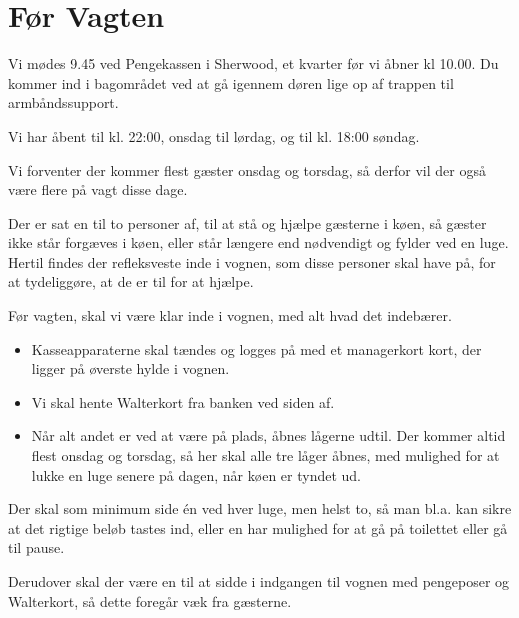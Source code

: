 \section{Før Vagten}
\label{sec:pre-vagten}

Vi mødes 9.45 ved Pengekassen i Sherwood, et kvarter før vi åbner kl 10.00.
Du kommer ind i bagområdet ved at gå igennem døren lige op af trappen til armbåndssupport.

Vi har åbent til kl. 22:00, onsdag til lørdag, og til kl. 18:00 søndag.

Vi forventer der kommer flest gæster onsdag og torsdag, 
så derfor vil der også være flere på vagt disse dage.

Der er sat en til to personer af, til at stå og hjælpe gæsterne i køen, 
så gæster ikke står forgæves i køen, eller står længere end nødvendigt og fylder ved en luge.
Hertil findes der refleksveste inde i vognen, som disse personer skal have på, 
for at tydeliggøre, at de er til for at hjælpe.

Før vagten, skal vi være klar inde i vognen, med alt hvad det indebærer. 
\begin{itemize}
	\item Kasseapparaterne skal tændes og logges på med et managerkort kort, der ligger på øverste hylde i vognen.
	\item Vi skal hente Walterkort fra banken ved siden af.
	\item Når alt andet er ved at være på plads, åbnes
	lågerne udtil. Der kommer altid flest onsdag og torsdag, så her skal alle tre låger åbnes, 
	med mulighed for at lukke en luge senere på dagen, når køen er tyndet ud.
\end{itemize}

Der skal som minimum side én ved hver luge, men helst to, så man bl.a. 
kan sikre at det rigtige beløb tastes ind, 
eller en har mulighed for at gå på toilettet eller gå til pause.

Derudover skal der være en til at sidde i indgangen til vognen med pengeposer og Walterkort, 
så dette foregår væk fra gæsterne.